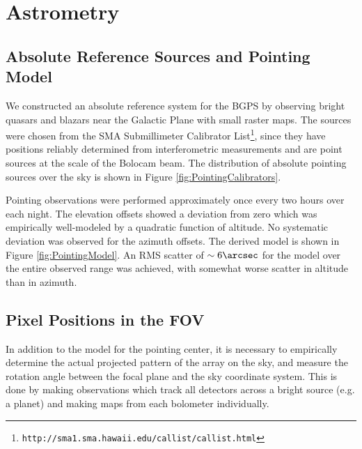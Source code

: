 \documentclass[12pt,preprint]{aastex}
\begin{document}
\section{Astrometry}
\label{sec:Astrometry}

\subsection{Absolute Reference Sources and Pointing Model}
\label{sec:PointingModel}

We constructed an absolute reference system for the BGPS by observing
bright quasars and blazars near the Galactic Plane with small raster
maps.  The sources were chosen from the SMA Submillimeter Calibrator
List\footnote{{\tt http://sma1.sma.hawaii.edu/callist/callist.html}},
since they have positions reliably determined from interferometric
measurements and are point sources at the scale of the Bolocam beam.
The distribution of absolute pointing sources over the sky is shown in
Figure \ref{fig:PointingCalibrators}.

Pointing observations were performed approximately once every two
hours over each night.  The elevation offsets showed a deviation from
zero which was empirically well-modeled by a quadratic function of
altitude.  No systematic deviation was observed for the azimuth
offsets.  The derived model is shown in Figure
\ref{fig:PointingModel}.  An RMS scatter of $\sim 6\arcsec$ for the
model over the entire observed range was achieved, with somewhat worse
scatter in altitude than in azimuth.

\subsection{Pixel Positions in the FOV}

In addition to the model for the pointing center, it is necessary to
empirically determine the actual projected pattern of the array on the
sky, and measure the rotation angle between the focal plane and the sky
coordinate system.  This is done by making observations which track
all detectors across a bright source (e.g. a planet) and making maps
from each bolometer individually.
\end{document}
